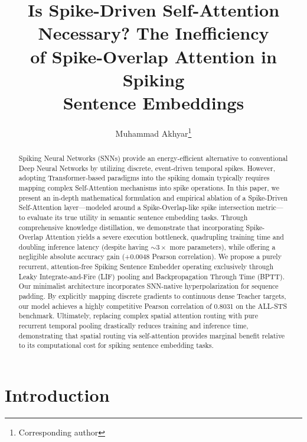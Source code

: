 \documentclass[final]{clv2025}
\begin{document}
\title{Is Spike-Driven Self-Attention Necessary? The Inefficiency\\ of Spike-Overlap Attention in Spiking\\ Sentence Embeddings}

\author{Muhammad Akhyar\thanks{Corresponding author}}


\maketitle

\begin{abstract}
Spiking Neural Networks (SNNs) provide an energy-efficient alternative to conventional Deep Neural Networks by utilizing discrete, event-driven temporal spikes. However, adopting Transformer-based paradigms into the spiking domain typically requires mapping complex Self-Attention mechanisms into spike operations. In this paper, we present an in-depth mathematical formulation and empirical ablation of a Spike-Driven Self-Attention layer—modeled around a Spike-Overlap-like spike intersection metric—to evaluate its true utility in semantic sentence embedding tasks. Through comprehensive knowledge distillation, we demonstrate that incorporating Spike-Overlap Attention yields a severe execution bottleneck, quadrupling training time and doubling inference latency (despite having $\sim 3\times$ more parameters), while offering a negligible absolute accuracy gain (+0.0048 Pearson correlation). We propose a purely recurrent, attention-free Spiking Sentence Embedder operating exclusively through Leaky Integrate-and-Fire (LIF) pooling and Backpropagation Through Time (BPTT). Our minimalist architecture incorporates SNN-native hyperpolarization for sequence padding. By explicitly mapping discrete gradients to continuous dense Teacher targets, our model achieves a highly competitive Pearson correlation of 0.8031 on the ALL-STS benchmark. Ultimately, replacing complex spatial attention routing with pure recurrent temporal pooling drastically reduces training and inference time, demonstrating that spatial routing via self-attention provides marginal benefit relative to its computational cost for spiking sentence embedding tasks.
\end{abstract}

\section{Introduction}
\end{document}
